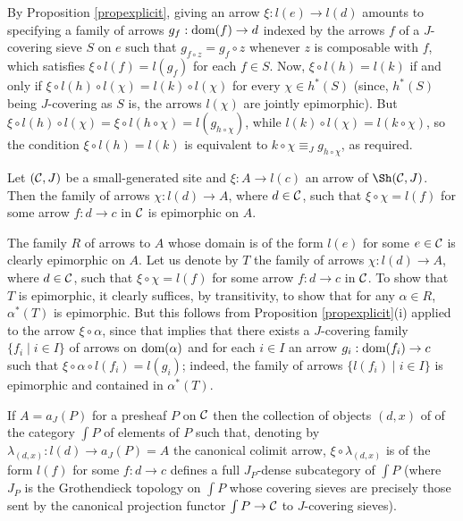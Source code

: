 \documentclass[a4paper,12pt]{article}
\begin{document}
\begin{proofs}
	By Proposition \ref{propexplicit}, giving an arrow $\xi:l(e)\to l(d)$ amounts to specifying a family of arrows $g_{f}:\textup{dom}(f)\to d$ indexed by the arrows $f$ of a $J$-covering sieve $S$ on $e$ such that $g_{f\circ z}=g_{f}\circ z$ whenever $z$ is composable with $f$, which satisfies $\xi\circ l(f)=l(g_{f})$ for each $f\in S$. Now, $\xi \circ l(h)=l(k)$ if and only if $\xi \circ l(h)\circ l(\chi)=l(k)\circ l(\chi)$ for every $\chi\in h^{\ast}(S)$ (since, $h^{\ast}(S)$ being $J$-covering as $S$ is, the arrows $l(\chi)$ are jointly epimorphic). But $\xi \circ l(h)\circ l(\chi)=\xi \circ l(h\circ \chi)=l(g_{h\circ \chi})$, while $l(k)\circ l(\chi)=l(k\circ \chi)$, so the condition $\xi \circ l(h)=l(k)$ is equivalent to $k\circ \chi\equiv_{J} g_{h\circ \chi}$, as required.   	
\end{proofs}

\begin{proposition}\label{proplifttosite}
	Let $({\cal C}, J)$ be a small-generated site and $\xi:A\to l(c)$ an arrow of $\Sh({\cal C}, J)$. Then the family of arrows $\chi:l(d)\to A$, where $d\in {\cal C}$, such that $\xi \circ \chi=l(f)$ for some arrow $f:d\to c$ in $\cal C$ is epimorphic on $A$.	
\end{proposition}

\begin{proofs}
	The family $R$ of arrows to $A$ whose domain is of the form $l(e)$ for some $e\in {\cal C}$ is clearly epimorphic on $A$. Let us denote by $T$ the family of arrows $\chi:l(d)\to A$, where $d\in {\cal C}$, such that $\xi \circ \chi=l(f)$ for some arrow $f:d\to c$ in $\cal C$. To show that $T$ is epimorphic, it clearly suffices, by transitivity, to show that for any  $\alpha\in R$, $\alpha^{\ast}(T)$ is epimorphic. But this follows from Proposition \ref{propexplicit}(i) applied to the arrow $\xi \circ \alpha$, since that implies that there exists a $J$-covering family $\{f_{i} \mid i\in I\}$ of arrows on $\textup{dom}(\alpha)$ and for each $i\in I$ an arrow $g_{i}:\textup{dom}(f_{i})\to c$ such that $\xi\circ \alpha \circ l(f_{i})=l(g_{i})$; indeed, the family of arrows $\{l(f_{i}) \mid i\in I\}$ is epimorphic and contained in $\alpha^{\ast}(T)$. 
\end{proofs}

\begin{remark}\label{remrelativetopology}
	If $A=a_{J}(P)$ for a presheaf $P$ on $\cal C$ then the collection of objects $(d, x)$ of of the category $\int P$ of elements of $P$ such that, denoting by $\lambda_{(d, x)}:l(d)\to a_{J}(P)=A$ the canonical colimit arrow, $\xi\circ \lambda_{(d, x)}$ is of the form $l(f)$ for some $f:d\to c$ defines a full $J_{P}$-dense subcategory of $\int P$ (where $J_{P}$ is the Grothendieck topology on $\int P$ whose covering sieves are precisely those sent by the canonical projection functor ${\int P}\to {\cal C}$ to $J$-covering sieves).  
\end{remark}
\end{document}
